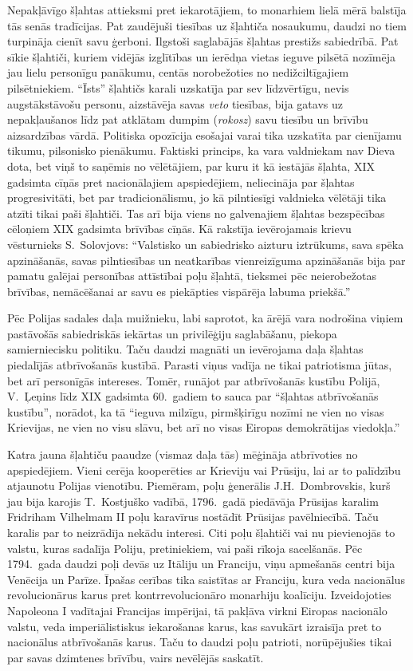 \documentclass[twoside,a5paper,12pt,fleqn,openany]{extbook}
\newcommand{\pltxti}[1]{\textit{\textpolish{#1}}}
\newcommand{\latxti}[1]{\textit{\textlatin{#1}}}
\begin{document}
Nepakļāvīgo šļahtas attieksmi pret iekarotājiem, to monarhiem lielā mērā balstīja tās senās tradīcijas. Pat zaudējuši tiesības uz šļahtiča nosaukumu, daudzi no tiem turpināja cienīt savu ģerboni. Ilgstoši saglabājās šļahtas prestižs sabiedrībā. Pat sīkie šļahtiči, kuriem vidējās izglītības un ierēdņa vietas ieguve pilsētā nozīmēja jau lielu personīgu panākumu, centās norobežoties no nedižciltīgajiem pilsētniekiem. ``Īsts'' šļahtičs karali uzskatīja par sev līdzvērtīgu, nevis augstākstāvošu personu, aizstāvēja savas \latxti{veto} tiesības, bija gatavs uz nepakļaušanos līdz pat atklātam dumpim (\pltxti{rokosz}) savu tiesību un brīvību aizsardzības vārdā. Politiska opozīcija esošajai varai tika uzskatīta par cienījamu tikumu, pilsonisko pienākumu. Faktiski princips, ka vara valdniekam nav Dieva dota, bet viņš to saņēmis no vēlētājiem, par kuru it kā iestājās šļahta, XIX gadsimta cīņās pret nacionālajiem apspiedējiem, neliecināja par šļahtas progresivitāti, bet par tradicionālismu, jo kā pilntiesīgi valdnieka vēlētāji tika atzīti tikai paši šļahtiči. Tas arī bija viens no galvenajiem šļahtas bezspēcības cēloņiem XIX gadsimta brīvības cīņās. Kā rakstīja ievērojamais krievu vēsturnieks S.~Solovjovs: ``Valstisko un sabiedrisko aizturu iztrūkums, sava spēka apzināšanās, savas pilntiesības un neatkarības vienreizīguma apzināšanās bija par pamatu galējai personības attīstībai poļu šļahtā, tieksmei pēc neierobežotas brīvības, nemācēšanai ar savu es piekāpties vispārēja labuma priekšā.''

Pēc Polijas sadales daļa muižnieku, labi saprotot, ka ārējā vara nodrošina viņiem pastāvošās sabiedriskās iekārtas un privilēģiju saglabāšanu, piekopa samierniecisku politiku. Taču daudzi magnāti un ievērojama daļa šļahtas piedalījās atbrīvošanās kustībā. Parasti viņus vadīja ne tikai patriotisma jūtas, bet arī personīgās intereses. Tomēr, runājot par atbrīvošanās kustību Polijā, V.~Ļeņins līdz XIX gadsimta 60.~gadiem to sauca par ``šļahtas atbrīvošanās kustību'', norādot, ka tā ``ieguva milzīgu, pirmšķirīgu nozīmi ne vien no visas Krievijas, ne vien no visu slāvu, bet arī no visas Eiropas demokrātijas viedokļa.''

Katra jauna šļahtiču paaudze (vismaz daļa tās) mēģināja atbrīvoties no apspiedējiem. Vieni cerēja kooperēties ar Krieviju vai Prūsiju, lai ar to palīdzību atjaunotu Polijas vienotību. Piemēram, poļu ģenerālis J.H.~Dombrovskis, kurš jau bija karojis T.~Kostjuško vadībā, 1796.~gadā piedāvāja Prūsijas karalim Fridriham Vilhelmam II poļu karavīrus nostādīt Prūsijas pavēlniecībā. Taču karalis par to neizrādīja nekādu interesi. Citi poļu šļahtiči vai nu pievienojās to valstu, kuras sadalīja Poliju, pretiniekiem, vai paši rīkoja sacelšanās. Pēc 1794.~gada daudzi poļi devās uz Itāliju un Franciju, viņu apmešanās centri bija Venēcija un Parīze. Īpašas cerības tika saistītas ar Franciju, kura veda nacionālus revolucionārus karus pret kontrrevolucionāro monarhiju koalīciju. Izveidojoties Napoleona I vadītajai Francijas impērijai, tā pakļāva virkni Eiropas nacionālo valstu, veda imperiālistiskus iekarošanas karus, kas savukārt izraisīja pret to nacionālus atbrīvošanās karus. Taču to daudzi poļu patrioti, norūpējušies tikai par savas dzimtenes brīvību, vairs nevēlējās saskatīt.
\end{document}
